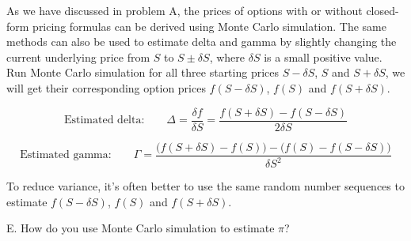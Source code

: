 \begin{solution}
As we have discussed in problem A, the prices of options with or without closed-form pricing
formulas can be derived using Monte Carlo simulation. The same methods can also be used to estimate
delta and gamma by slightly changing the current underlying price from $S$ to $S\pm\delta S$, where
$\delta S$ is a small positive value. Run Monte Carlo simulation for all three starting prices
$S-\delta S$, $S$ and $S+\delta S$, we will get their corresponding option prices
$f(S-\delta S)$, $f(S)$ and $f(S+\delta S)$.

\[
\text{Estimated delta:}\qquad
\Delta=\frac{\delta f}{\delta S}=\frac{f(S+\delta S)-f(S-\delta S)}{2\delta S}
\]

\[
\text{Estimated gamma:}\qquad
\Gamma=\frac{\bigl(f(S+\delta S)-f(S)\bigr)-\bigl(f(S)-f(S-\delta S)\bigr)}{\delta S^2}
\]

To reduce variance, it's often better to use the same random number sequences to estimate
$f(S-\delta S)$, $f(S)$ and $f(S+\delta S)$.\footnotemark[14]

\end{solution}

\begin{problem}{E. How do you use Monte Carlo simulation to estimate $\pi$?}
\end{problem}

